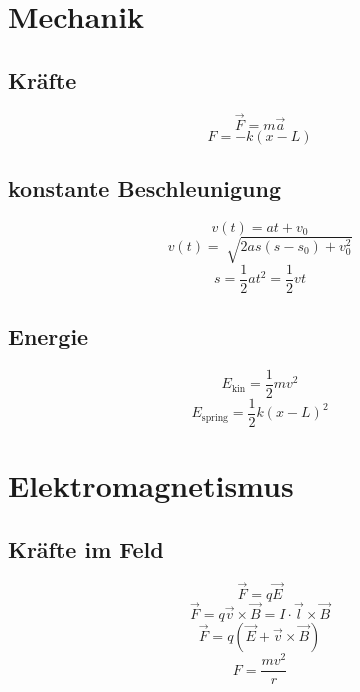 \documentclass[10pt,landscape,a4paper]{article}
\begin{document}
\small
\begin{multicols*}{5}
		\section*{Mechanik}
		\subsection*{Kräfte}
		\[
		\vec{F}=m \vec{a}
		\]
		\[
				F=-k(x-L)
		\]
		\subsection*{konstante Beschleunigung}
		\[
				v(t) = at+v_0
		\]
		\[
				v(t)= \sqrt[]{2as(s-s_0)+v_0^{2}}
		\]
		\[
		s= \frac{1}{2} at^{2}= \frac{1}{2} vt
		\]
		\subsection*{Energie}
		\[
				E_{\textrm{kin}} = \frac{1}{2} mv^{2}
		\]
		\[
				E_{\textrm{spring}}= \frac{1}{2} k(x-L)^{2}
		\]


\section*{Elektromagnetismus}
		\subsection*{Kräfte im Feld}
		\[
		\vec{F}=q \vec{E}
		\]
		\[
				\vec{F}=q \vec{v} \times \vec{B} = I \cdot \vec{l} \times \vec{B}
		\]
		\[
				\vec{F} = q( \vec{E} + \vec{v} \times \vec{B})
		\]
		\[
		F = \frac{mv^{2}}{r} 
		\]
\end{multicols*}
\end{document}
